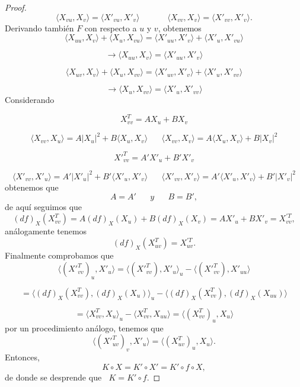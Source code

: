 \begin{proof}
	\[
		\langle X_{vu}, X_v \rangle = \langle X'_{vu}, X'_v \rangle \;\;\;\;\;\;  \;\;\;\;\;\; \langle X_{vv}, X_v \rangle = \langle X'_{vv}, X'_v \rangle.
	\]
	${ }$\\
	
	Derivando también $F$ con respecto a $u$ y $v$, obtenemos
	${ }$\\
	\[
		\langle X_{uu}, X_v \rangle + \langle X_u, X_{vu} \rangle = \langle X'_{uu}, X'_v \rangle + \langle X'_u, X'_{vu} \rangle
	\]
	
	\[
		\to \langle X_{uu}, X_v \rangle = \langle X'_{uu}, X'_v \rangle
	\]
	
	\[
		\langle X_{uv}, X_v \rangle + \langle X_u, X_{vv} \rangle = \langle X'_{uv}, X'_v \rangle + \langle X'_u, X'_{vv} \rangle
	\]
	
	\[
		\to \langle X_u, X_{vv} \rangle = \langle X'_u, X'_{vv} \rangle
	\]
	${ }$\\
	
	Considerando
	
	\[
		X^{T}_{vv} = AX_u + BX_v
	\]
	
	\[
		\langle X_{vv}, X_u \rangle = A|X_u|^2 + B \langle X_u, X_v \rangle \;\;\;\;\;\; \langle X_{vv}, X_v \rangle = A \langle X_u, X_v \rangle + B|X_v|^2
	\]
	
	\[
		{X'}^{T}_{vv} = A'X'_u + B'X'_v
	\]
	
	\[
		\langle X'_{vv}, X'_u \rangle = A'|X'_u|^2 + B'\langle X'_u, X'_v \rangle \;\;\;\;\;\; \langle X'_{vv}, X'_v \rangle = A' \langle X'_u, X'_v \rangle + B'|X'_v|^2
	\]
	${ }$\\
	obtenemos que
	${ }$\\
	\[
		A = A' \;\;\;\;\;\; y \;\;\;\;\;\; B = B',
	\]
	${ }$\\
	de aquí seguimos que
	${ }$\\
	\[
		(df)_X(X^{T}_{vv}) = A(df)_X(X_u) + B(df)_X(X_v) = AX'_u + BX'_v = X^{'T}_{vv},
	\]
	${ }$\\
	análogamente tenemos
	${ }$\\
	\[
		(df)_X(X^{T}_{uv}) = X^{'T}_{uv}.
	\]
	${ }$\\
	
	Finalmente comprobamos que
	${ }$\\
	\[
		\langle (X'^{T}_{vv})_u, X'_u \rangle = \langle (X'^{T}_{vv}), X'_u \rangle _u - \langle (X'^{T}_{vv}), X'_{uu} \rangle
	\]
	
	\[
		= \langle (df)_X(X^{T}_{vv}), (df)_X(X_u) \rangle _u - \langle (df)_X(X^{T}_{vv}), (df)_X(X_{uu}) \rangle
	\]
	
	\[
		= \langle X^{T}_{vv}, X_u \rangle _u - \langle X^{T}_{vv}, X_{uu} \rangle = \langle (X^{T}_{vv})_u, X_u \rangle
	\]
	${ }$\\
	por un procedimiento análogo, tenemos que
	${ }$\\
	\[
		\langle (X'^{T}_{uv})_v, X'_u \rangle = \langle (X^{T}_{uv})_u, X_u \rangle.
	\]
	${ }$\\	
	
	Entonces,
	${ }$\\
	\[
		K \circ X = K' \circ X' = K' \circ f \circ X,
	\]
	${ }$\\
	de donde se desprende que   $\;\; K = K' \circ f$.
	
\end{proof}
